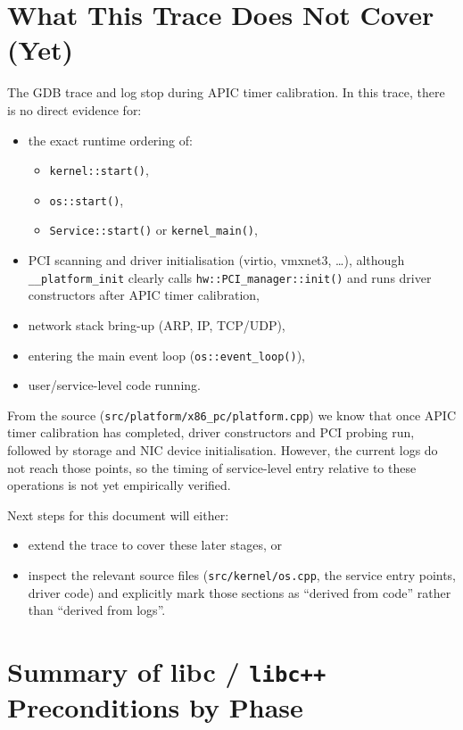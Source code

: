 \documentclass[a4paper,11pt]{article}
\begin{document}
\section{What This Trace Does Not Cover (Yet)}

The GDB trace and log stop during APIC timer calibration. In this trace,
there is no direct evidence for:

\begin{itemize}
  \item the exact runtime ordering of:
    \begin{itemize}
      \item \texttt{kernel::start()},
      \item \texttt{os::start()},
      \item \texttt{Service::start()} or \texttt{kernel\_main()},
    \end{itemize}
  \item PCI scanning and driver initialisation (virtio, vmxnet3, \dots),
    although \texttt{\_\_platform\_init} clearly calls
    \texttt{hw::PCI\_manager::init()} and runs driver constructors
    after APIC timer calibration,
  \item network stack bring-up (ARP, IP, TCP/UDP),
  \item entering the main event loop (\texttt{os::event\_loop()}),
  \item user/service-level code running.
\end{itemize}

From the source (\texttt{src/platform/x86\_pc/platform.cpp}) we know
that once APIC timer calibration has completed, driver constructors and
PCI probing run, followed by storage and NIC device initialisation.
However, the current logs do not reach those points, so the timing of
service-level entry relative to these operations is not yet empirically
verified.

Next steps for this document will either:

\begin{itemize}
  \item extend the trace to cover these later stages, or
  \item inspect the relevant source files (\texttt{src/kernel/os.cpp},
        the service entry points, driver code) and explicitly mark those
        sections as “derived from code” rather than “derived from logs”.
\end{itemize}

\section{Summary of libc / \texorpdfstring{\texttt{libc++}}{libc++} Preconditions by Phase}
\end{document}

